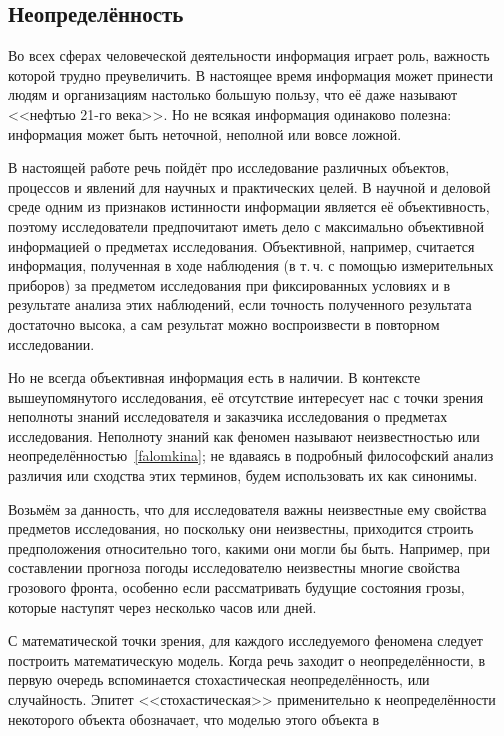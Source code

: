 
\subsection{Неопределённость}
\label{sec:intro_uncertainty}

Во всех сферах человеческой деятельности информация играет роль, важность которой трудно преувеличить. В настоящее время информация  может принести людям и организациям настолько большую пользу, что её даже называют <<нефтью 21-го века>>. Но не всякая информация одинаково полезна: информация может быть неточной, неполной или вовсе ложной.  

В настоящей работе речь пойдёт про исследование различных объектов, процессов и явлений для научных и практических целей. В научной и деловой среде одним из признаков истинности информации является её объективность, поэтому исследователи предпочитают иметь дело с максимально объективной информацией о предметах исследования.  Объективной, например, считается информация, полученная в ходе наблюдения (в т.\,ч. с помощью измерительных приборов) за предметом исследования при фиксированных условиях и в результате анализа этих наблюдений, если точность полученного результата достаточно высока, а сам результат можно воспроизвести в повторном исследовании. 
  
Но не всегда объективная информация есть в наличии. В контексте вышеупомянутого исследования, её отсутствие интересует нас с точки зрения неполноты знаний исследователя и заказчика исследования о предметах исследования. Неполноту знаний как феномен называют неизвестностью или неопределённостью~\ref{falomkina}; не вдаваясь в подробный философский анализ различия или сходства этих терминов, будем использовать их как синонимы.  

Возьмём за данность, что для исследователя важны неизвестные ему свойства предметов исследования, но поскольку они неизвестны, приходится строить предположения относительно того, какими они могли бы быть. Например, при составлении прогноза погоды исследователю неизвестны многие свойства грозового фронта, особенно если рассматривать будущие состояния грозы, которые наступят через несколько часов или дней.

С математической точки зрения, для каждого исследуемого феномена следует построить математическую модель.  Когда речь заходит о неопределённости, в первую очередь вспоминается стохастическая неопределённость, или случайность. Эпитет <<стохастическая>> применительно к неопределённости некоторого объекта обозначает, что моделью этого объекта в 

